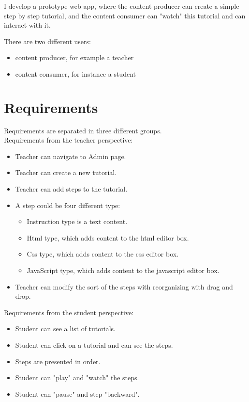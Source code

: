 \documentclass[11pt, a4paper, twoside, openright]{report}
\begin{document}
I develop a prototype web app, where the content producer can create a simple step by step tutorial, and the content consumer can "watch" this tutorial and can interact with it.

There are two different users:
\begin{itemize}[noitemsep]
\item content producer, for example a teacher
\item content consumer, for instance a student
\end{itemize}

\section{Requirements}

Requirements are separated in three different groups.\\

\noindent Requirements from the teacher perspective:
\begin{itemize}[noitemsep]
\item Teacher can navigate to Admin page.
\item Teacher can create a new tutorial.
\item Teacher can add steps to the tutorial.
\item A step could be four different type:
\begin{itemize}[noitemsep]
\item Instruction type is a text content.
\item Html type, which adds content to the html editor box.
\item Css type, which adds content to the css editor box.
\item JavaScript type, which adds content to the javascript editor box.
\end{itemize}
\item Teacher can modify the sort of the steps with reorganizing with drag and drop.
\end{itemize}

\noindent Requirements from the student perspective:
\begin{itemize}[noitemsep]
\item Student can see a list of tutorials.
\item Student can click on a tutorial and can see the steps.
\item Steps are presented in order.
\item Student can "play" and "watch" the steps.
\item Student can "pause" and step "backward".
\end{itemize}
\end{document}

